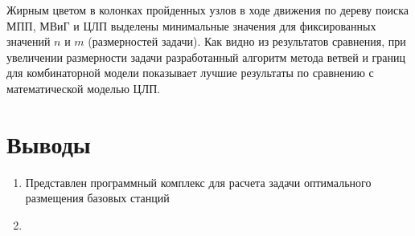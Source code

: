 Жирным цветом в колонках пройденных узлов в ходе движения по дереву поиска МПП, МВиГ и ЦЛП выделены минимальные значения для фиксированных значений $n$ и $m$ (размерностей задачи). Как видно из результатов сравнения, при увеличении размерности задачи разработанный алгоритм метода ветвей и границ для комбинаторной модели показывает лучшие результаты по сравнению с математической моделью ЦЛП.

\section{Выводы}

\begin{enumerate}
  \item Представлен программный комплекс для расчета задачи оптимального размещения базовых станций
  \item 
\end{enumerate}